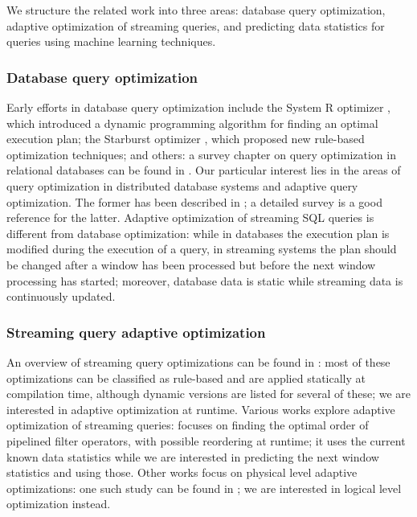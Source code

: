 \label {sec:fs-optimization-related-work}

We structure the related work into three areas: database query optimization, adaptive optimization of streaming queries, and predicting data statistics for queries using machine learning techniques.

\subsubsection*{Database query optimization}
Early efforts in database query optimization include the System R optimizer \cite{selinger1979access}, which introduced a dynamic programming algorithm for finding an optimal execution plan; the Starburst optimizer \cite{haas1989extensible}, which proposed new rule-based optimization techniques; and others: a survey chapter on query optimization in relational databases can be found in \cite{Neumann2018optimization}. Our particular interest lies in the areas of query optimization in distributed database systems and adaptive query optimization. The former has been described in \cite{kossmann2000thestate}; a detailed survey \cite{deshpande2007adaptive} is a good reference for the latter. Adaptive optimization of streaming SQL queries is different from database optimization: while in databases the execution plan is modified during the execution of a query, in streaming systems the plan should be changed after a window has been processed but before the next window processing has started; moreover, database data is static while streaming data is continuously updated.

\subsubsection*{Streaming query adaptive optimization}
An overview of streaming query optimizations can be found in \cite{hirzel2014catalog}: most of these optimizations can be classified as rule-based and are applied statically at compilation time, although dynamic versions are listed for several of these; we are interested in adaptive optimization at runtime. Various works explore adaptive optimization of streaming queries: \cite{babu2004adaptive} focuses on finding the optimal order of pipelined filter operators, with possible reordering at runtime; it uses the current known data statistics while we are interested in predicting the next window statistics and using those. Other works focus on physical level adaptive optimizations: one such study can be found in \cite{grulich2020grizzly}; we are interested in logical level optimization instead.

